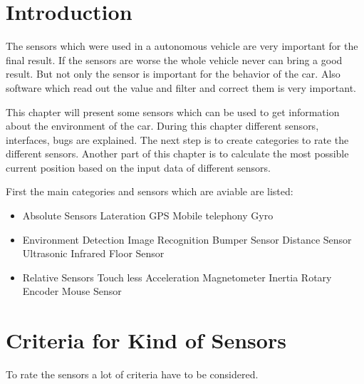 \section{Introduction}\label{sec:positioningIntroduction}
The sensors which were used in a autonomous vehicle are very important for the final result.
If the sensors are worse the whole vehicle never can bring a good result.
But not only the sensor is important for the behavior of the car.
Also software which read out the value and filter and correct them is very important.

This chapter will present some sensors which can be used to get information about the environment of the car.
During this chapter different sensors, interfaces, bugs are explained.
The next step is to create categories to rate the different sensors.
Another part of this chapter is to calculate the most possible current position based on the input data of different sensors.

First the main categories and sensors which are aviable are listed:
\begin{itemize}
\item Absolute Sensors
	\subitem Lateration
		\subsubitem GPS	
		\subsubitem Mobile telephony
	\subsubitem Gyro
\item Environment Detection
	\subitem Image Recognition
	\subitem Bumper Sensor
	\subitem Distance Sensor
		\subsubitem Ultrasonic
		\subsubitem Infrared
	\subitem Floor Sensor
\item Relative Sensors
	\subitem Touch less
		\subsubitem Acceleration
		\subsubitem Magnetometer
	\subitem Inertia
		\subsubitem Rotary Encoder
		\subsubitem Mouse Sensor
\end{itemize}


\section{Criteria for Kind of Sensors}
To rate the sensors a lot of criteria have to be considered.


